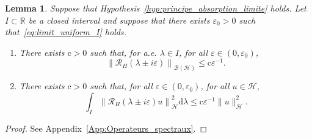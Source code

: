 \documentclass[10pt]{amsart}
\newtheorem{lemm}[theo]{Lemma}\newtheorem{prop}[theo]{Proposition}\newtheorem{coro}[theo]{Corollary}\newtheorem{conj}[theo]{Conjecture}
\theoremstyle{definition}\newtheorem{defi}[theo]{Definition}\newtheorem{rema}[theo]{Remark}\newtheorem{exam}[theo]{Example}\newtheorem{exem}[theo]{Example}\newtheorem{nota}[theo]{Notation}
\newcommand{\Hi}{\mathcal{H}}
\newcommand{\R}{\mathbb{R}}
\newcommand{\rmc}{\mathrm{c}}
\newcommand{\rmd}{\mathrm{d}}
\newcommand{\Res}{\mathcal{R}}
\newcommand{\clB}{\mathcal{B}}
\newcommand*{\romanenumi}{\renewcommand*{\theenumi}{\roman{enumi}}}
\begin{document}
\begin{lemm}\label{lm:res_bound}
Suppose that Hypothesis~\ref{hyp:principe_absorption_limite} holds. Let $I\subset\R$ be a closed interval and suppose that there exists $\varepsilon_0>0$ such that~\eqref{eq:limit_uniform_I} holds.
\begin{enumerate}\romanenumi
\item\label{it:res_bound1}
There exists $\rmc>0$ such that, for a.e. $\lambda\in I$, for all $\varepsilon\in(0,\varepsilon_0)$,
\begin{equation*}
\left\|\Res_H(\lambda\pm i\varepsilon)\right\|_{\clB(\Hi)}\le\rmc\varepsilon^{-1}.
\end{equation*}
\item\label{it:res_bound2}
There exists $\rmc>0$ such that, for all $\varepsilon\in(0,\varepsilon_0)$, for all $u\in\Hi$,
\begin{equation*}
\int_I \left\|\Res_H(\lambda\pm i\varepsilon) u\right\|_\Hi^2\rmd \lambda \le \rmc\varepsilon^{-1} \|u\|^2_\Hi.
\end{equation*}
\end{enumerate}
\end{lemm}

\begin{proof}
See Appendix~\ref{App:Operateurs_spectraux}.
\end{proof}
\end{document}

